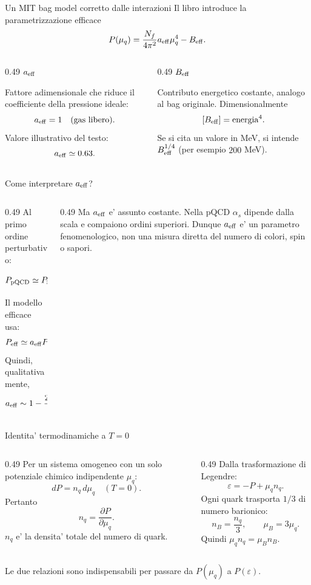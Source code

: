 \begin{frame}{Un MIT bag model corretto dalle interazioni}
\small
Il libro introduce la parametrizzazione efficace
\[
P(\mu_q)=\frac{N_f}{4\pi^2}a_{\rm eff}\mu_q^4-B_{\rm eff}.
\]
\begin{columns}[T,onlytextwidth]
\begin{column}{0.49\textwidth}
\textbf{$a_{\rm eff}$}

Fattore adimensionale che riduce
il coefficiente della pressione ideale:
\[
a_{\rm eff}=1\quad\text{(gas libero)}.
\]
Valore illustrativo del testo:
\[
a_{\rm eff}\simeq0.63.
\]
\end{column}
\begin{column}{0.49\textwidth}
\textbf{$B_{\rm eff}$}

Contributo energetico costante,
analogo al bag originale.
\medskip
Dimensionalmente
\[
[B_{\rm eff}]={\rm energia}^4.
\]
Se si cita un valore in MeV, si intende
$B_{\rm eff}^{1/4}$ (per esempio $200$ MeV).
\end{column}
\end{columns}
\end{frame}

\begin{frame}{Come interpretare $a_{\rm eff}$?}
\small
\begin{columns}[T,onlytextwidth]
\begin{column}{0.49\textwidth}
Al primo ordine perturbativo:
\[
P_{\rm pQCD}\simeq P_{\rm SB}
\left(1-\frac{2\alpha_s}{\pi}\right).
\]
Il modello efficace usa:
\[
P_{\rm eff}\simeq a_{\rm eff}P_{\rm SB}
\quad(B_{\rm eff}\text{ trascurato}).
\]
Quindi, qualitativamente,
\[
a_{\rm eff}\sim1-\frac{2\alpha_s}{\pi}.
\]
\end{column}
\begin{column}{0.49\textwidth}
Ma $a_{\rm eff}$ e' assunto costante.
\medskip
Nella pQCD $\alpha_s$ dipende dalla scala
e compaiono ordini superiori.
\medskip
Dunque $a_{\rm eff}$ e' un parametro
fenomenologico, non una misura diretta
del numero di colori, spin o sapori.
\end{column}
\end{columns}
\end{frame}

\begin{frame}{Identita' termodinamiche a $T=0$}
\small
\begin{columns}[T,onlytextwidth]
\begin{column}{0.49\textwidth}
Per un sistema omogeneo con un solo
potenziale chimico indipendente $\mu_q$:
\[
dP=n_q\,d\mu_q
\quad(T=0).
\]
Pertanto
\[
n_q=\frac{\partial P}{\partial\mu_q}.
\]
$n_q$ e' la densita' totale del numero di quark.
\end{column}
\begin{column}{0.49\textwidth}
Dalla trasformazione di Legendre:
\[
\varepsilon=-P+\mu_qn_q.
\]
Ogni quark trasporta $1/3$ di numero barionico:
\[
n_B=\frac{n_q}{3},
\qquad \mu_B=3\mu_q.
\]
Quindi $\mu_qn_q=\mu_Bn_B$.
\end{column}
\end{columns}
\medskip
Le due relazioni sono indispensabili per passare da $P(\mu_q)$ a $P(\varepsilon)$.
\end{frame}

